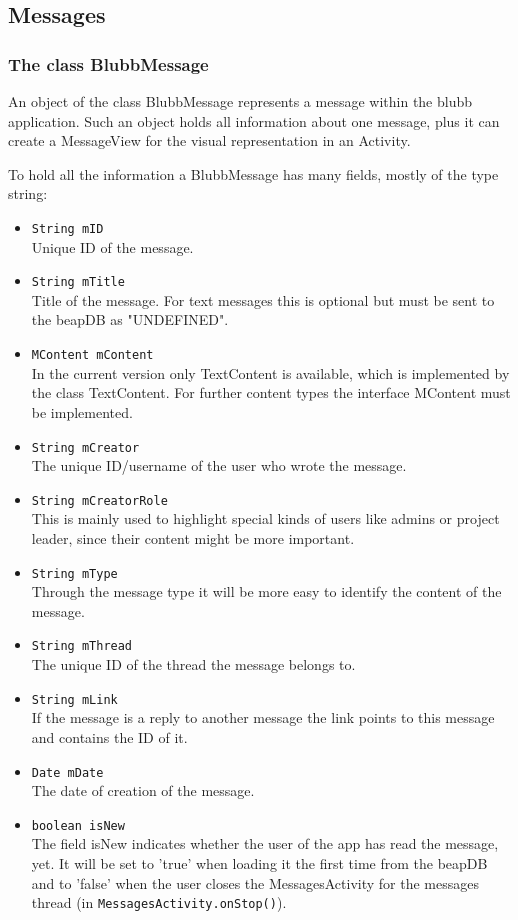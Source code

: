 \documentclass[12pt,a4paper,oneside]{report}
\newcommand{\appname}{blubb}
\newcommand{\beapDB}{beapDB}
\newcommand{\code}[1]{\lstinline{#1}}
\begin{document}
\subsection{Messages}
\subsubsection{The class BlubbMessage}
An object of the class BlubbMessage represents a message within the \appname{} application. Such an object holds all information about one message, plus it can create a MessageView for the visual representation in an Activity. 

To hold all the information a BlubbMessage has many fields, mostly of the type string: 
\begin{itemize}
\item \code{String mID}\\
Unique ID of the message.
\item \code{String mTitle}\\
Title of the message. For text messages this is optional but must be sent to the \beapDB{} as "UNDEFINED".
\item \code{MContent mContent}\\
In the current version only TextContent is available, which is implemented by the class TextContent. For further content types the interface MContent must be implemented. 
\item \code{String mCreator}\\
The unique ID/username of the user who wrote the message.
\item \code{String mCreatorRole}\\
This is mainly used to highlight special kinds of users like admins or project leader, since their content might be more important.
\item \code{String mType}\\
Through the message type it will be more easy to identify the content of the message.
\item \code{String mThread}\\
The unique ID of the thread the message belongs to.
\item \code{String mLink}\\
If the message is a reply to another message the link points to this message and contains the ID of it.
\item \code{Date mDate}\\
The date of creation of the message. 
\item \code{boolean isNew}\\
The field isNew indicates whether the user of the app has read the message, yet. It will be set to 'true' when loading it the first time from the \beapDB{} and to 'false' when the user closes the MessagesActivity for the messages thread (in \code{MessagesActivity.onStop()}). 

\end{itemize}
\end{document}
